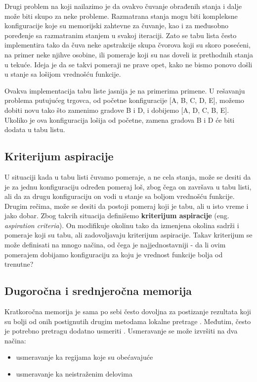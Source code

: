 \documentclass[a4paper]{article}
\begin{document}
Drugi problem na koji nailazimo je da ovakvo čuvanje obrađenih stanja i dalje može biti skupo za neke probleme.\cite{coursera} Razmatrana stanja mogu biti kompleksne konfiguracije koje su memorijski zahtevne za čuvanje, kao i za međusobno poređenje sa razmatranim stanjem u svakoj iteraciji. Zato se tabu lista često implementira tako da čuva neke apstrakcije skupa čvorova koji su skoro posećeni, na primer neke njihve osobine, ili pomeraje koji su nas doveli iz prethodnih stanja u tekuće. Ideja je da se takvi pomeraji ne prave opet, kako ne bismo ponovo došli u stanje sa lošijom vrednošću funkcije.

Ovakva implementacija tabu liste jasnija je na primerima primene. U rešavanju problema putujućeg trgovca, od početne konfiguracije [A, B, C, D, E], možemo dobiti novu tako što zamenimo gradove B i D, i dobijemo [A, D, C, B, E]. Ukoliko je ova konfiguracija lošija od početne, zamena gradova B i D će biti dodata u tabu listu.

\subsection{Kriterijum aspiracije}
U situaciji kada u tabu listi čuvamo pomeraje, a ne cela stanja, može se desiti da je za jednu konfiguraciju određen pomeraj loš, zbog čega on završava u tabu listi, ali da za drugu konfiguraciju on vodi u stanje sa boljom vrednošću funkcije. Drugim rečima, može se desiti da postoji pomeraj koji je tabu, ali u isto vreme i jako dobar. Zbog takvih situacija definišemo  \textbf{kriterijum aspiracije} (eng. \textit{aspiration criteria}). On modifikuje okolinu tako da izmenjena okolina sadrži i pomeraje koji su tabu, ali zadovoljavaju kriterijum aspiracije. Takav kriterijum se može definisati na mnogo načina, od čega je najjednostavniji - da li ovim pomerajem dobijamo konfiguraciju za koju je vrednost funkcije bolja od trenutne?

\subsection{Dugoročna i srednjeročna memorija}
Kratkoročna memorija je sama po sebi često dovoljna za postizanje rezultata koji su bolji od onih postignutih drugim metodama lokalne pretrage \cite{shortonly}. Međutim, često je potrebno pretragu dodatno usmeriti \cite{glovertutorial}. Usmeravanje se može izvršiti na dva načina:

\begin{itemize}
    \item usmeravanje ka regijama koje su obećavajuće
    \item usmeravanje ka neistraženim delovima
\end{itemize}
\end{document}

